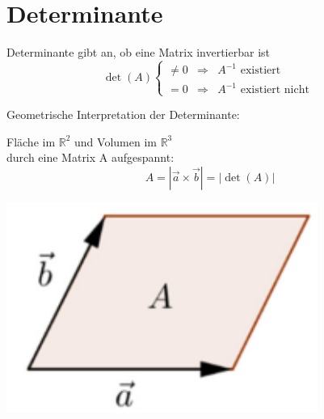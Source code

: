 \graphicspath{{images/}}

\section{Determinante}

    \begin{definition}{Determinante}
        gibt an, ob eine Matrix invertierbar ist
        \begin{equation*}
            \det(A)
            \left\{
                \begin{array}{lll}
                    \neq 0   &\Rightarrow    & A^{-1} \text{ existiert }\\
                    = 0     &\Rightarrow    & A^{-1} \text{ existiert nicht }
                \end{array}
            \right.
        \end{equation*}
    \end{definition}

    

    \begin{definition}{Geometrische Interpretation} der Determinante:\\
        \begin{minipage}{0.7\linewidth}
        Fläche im $\mathbb{R}^2$ und Volumen im $\mathbb{R}^3$\\
        durch eine Matrix A aufgespannt:
        $$A = |\vec{a} \times \vec{b}| = |\det(A)|$$
        \end{minipage}
        \begin{minipage}{0.25\linewidth}
            \includegraphics[width=1\linewidth]{images/determinante.png}
        \end{minipage}
    \end{definition}

